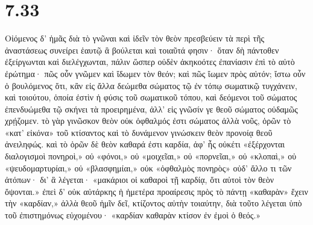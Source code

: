 \section*{7.33}

Οἰόμενος δ' ἡμᾶς διὰ τὸ γνῶναι καὶ ἰδεῖν τὸν θεὸν πρεσβεύειν τὰ περὶ τῆς ἀναστάσεως συνείρει ἑαυτῷ ἃ βούλεται καὶ τοιαῦτά φησιν· ὅταν δὴ πάντοθεν ἐξείργωνται καὶ διελέγχωνται, πάλιν ὥσπερ οὐδὲν ἀκηκοότες ἐπανίασιν ἐπὶ τὸ αὐτὸ ἐρώτημα· πῶς οὖν γνῶμεν καὶ ἴδωμεν τὸν θεόν; καὶ πῶς ἴωμεν πρὸς αὐτόν; ἴστω οὖν ὁ βουλόμενος ὅτι, κἂν εἰς ἄλλα δεώμεθα σώματος τῷ ἐν τόπῳ σωματικῷ τυγχάνειν, καὶ τοιούτου, ὁποία ἐστὶν ἡ φύσις τοῦ σωματικοῦ τόπου, καὶ δεόμενοι τοῦ σώματος ἐπενδυώμεθα τῷ σκήνει τὰ προειρημένα, ἀλλ' εἰς γνῶσίν γε θεοῦ σώματος οὐδαμῶς χρῄζομεν. τὸ γὰρ γινῶσκον θεὸν οὐκ ὀφθαλμός ἐστι σώματος ἀλλὰ νοῦς, ὁρῶν τὸ «κατ' εἰκόνα» τοῦ κτίσαντος καὶ τὸ δυνάμενον γινώσκειν θεὸν προνοίᾳ θεοῦ ἀνειληφώς. καὶ τὸ ὁρῶν δὲ θεὸν καθαρά ἐστι καρδία, ἀφ' ἧς οὐκέτι «ἐξέρχονται διαλογισμοὶ πονηροὶ,» οὐ «φόνοι,» οὐ «μοιχεῖαι,» οὐ «πορνεῖαι,» οὐ «κλοπαὶ,» οὐ «ψευδομαρτυρίαι,» οὐ «βλασφημίαι,» οὐκ «ὀφθαλμὸς πονηρὸς» οὐδ' ἄλλο τι τῶν ἀτόπων· δι' ἃ λέγεται· «μακάριοι οἱ καθαροὶ τῇ καρδίᾳ, ὅτι αὐτοὶ τὸν θεὸν ὄψονται.» ἐπεὶ δ' οὐκ αὐτάρκης ἡ ἡμετέρα προαίρεσις πρὸς τὸ πάντῃ «καθαρὰν» ἔχειν τὴν «καρδίαν,» ἀλλὰ θεοῦ ἡμῖν δεῖ, κτίζοντος αὐτὴν τοιαύτην, διὰ τοῦτο λέγεται ὑπὸ τοῦ ἐπιστημόνως εὐχομένου· «καρδίαν καθαρὰν κτίσον ἐν ἐμοὶ ὁ θεός.»